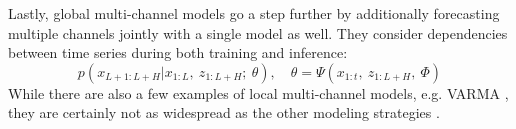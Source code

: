\documentclass[a4paper,oneside,bibliography=totoc]{scrbook}
\begin{document}
Lastly, global multi-channel models go a step further by additionally forecasting multiple channels jointly with a single model as well. They consider dependencies between time series during both training and inference:
\begin{equation}
    p(x_{L+1:L+H}|x_{1:L},\ z_{1:L+H};\ \theta), \quad \theta=\Psi(x_{1:t},\ z_{1:L+H},\ \Phi)
    \label{eq:global_multivariate}
\end{equation}
While there are also a few examples of local multi-channel models, e.g. VARMA \cite{lutkepohl_vector_2005}, they are certainly not as widespread as the other modeling strategies \cite{benidis_deep_2022}.
\newline
\end{document}
